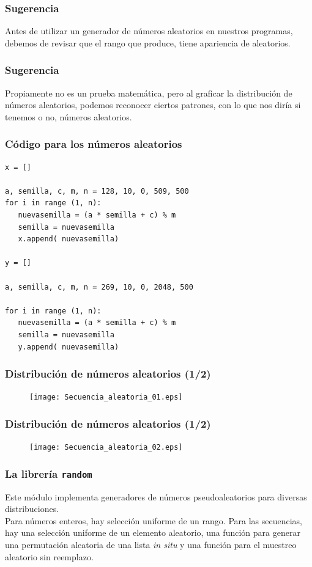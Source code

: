 \begin{frame}
\frametitle{Sugerencia}
Antes de utilizar un generador de números aleatorios en nuestros programas, debemos de revisar que el rango que produce, tiene apariencia de aleatorios.
\end{frame}
\begin{frame}
\frametitle{Sugerencia}
Propiamente no es un prueba matemática, pero al graficar la distribución de números aleatorios, podemos reconocer ciertos patrones, con lo que nos diría si tenemos o no, números aleatorios.
\end{frame}
\begin{frame}
\frametitle{Código para los números aleatorios}
\begin{lstlisting}[caption=Código distribución, style=FormattedNumber, basicstyle=\linespread{1.1}\ttfamily=\small, columns=fullflexible]
x = []

a, semilla, c, m, n = 128, 10, 0, 509, 500
for i in range (1, n):
   nuevasemilla = (a * semilla + c) % m
   semilla = nuevasemilla
   x.append( nuevasemilla)

y = []

a, semilla, c, m, n = 269, 10, 0, 2048, 500

for i in range (1, n):
   nuevasemilla = (a * semilla + c) % m
   semilla = nuevasemilla
   y.append( nuevasemilla)
\end{lstlisting}
\end{frame}
\begin{frame}[fragile]
\frametitle{Distribución de números aleatorios (1/2)}
\begin{figure}
  \centering
  \texttt{[image: Secuencia\_aleatoria\_01.eps]}
\end{figure}
\end{frame}
\begin{frame}[fragile]
\frametitle{Distribución de números aleatorios (1/2)}
\begin{figure}
  \centering
  \texttt{[image: Secuencia\_aleatoria\_02.eps]}
\end{figure}
\end{frame}
\begin{frame}
\frametitle{La librería \texttt{random}}
Este módulo implementa generadores de números pseudoaleatorios para diversas distribuciones.
\\
\bigskip
Para números enteros, hay selección uniforme de un rango. Para las secuencias, hay una selección uniforme de un elemento aleatorio, una función para generar una permutación aleatoria de una lista \emph{in situ} y una función para el muestreo aleatorio sin reemplazo.
\end{frame}
